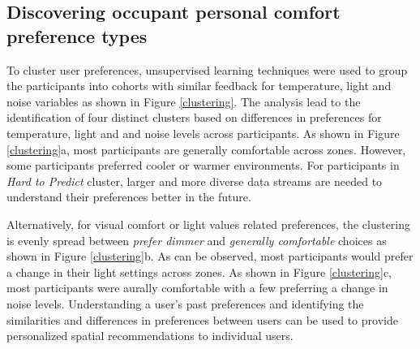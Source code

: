 \documentclass[]{interact}
\theoremstyle{plain}%
\theoremstyle{definition}
\theoremstyle{remark}
\begin{document}
\subsection{Discovering occupant personal comfort preference types}
To cluster user preferences, unsupervised learning techniques were used to group the participants into cohorts with similar feedback for temperature, light and noise variables as shown in Figure \ref{clustering}.  The analysis lead to the identification of four distinct clusters based on differences in preferences for temperature, light and and noise levels across participants. As shown in Figure \ref{clustering}a, most participants are generally comfortable across zones. However, some participants preferred cooler or warmer environments. For participants in \emph{Hard to Predict} cluster, larger and more diverse data streams are needed to understand their preferences better in the future.


Alternatively, for visual comfort or light values related preferences, the clustering is evenly spread between \emph{prefer dimmer} and \emph{generally comfortable} choices as shown in Figure \ref{clustering}b. As can be observed, most participants would prefer a change in their light settings across zones. As shown in Figure \ref{clustering}c, most participants were aurally comfortable with a few preferring a change in noise levels. Understanding a user's past preferences and identifying the similarities and differences in preferences between users can be used to provide personalized spatial recommendations to individual users.                

\end{document}
